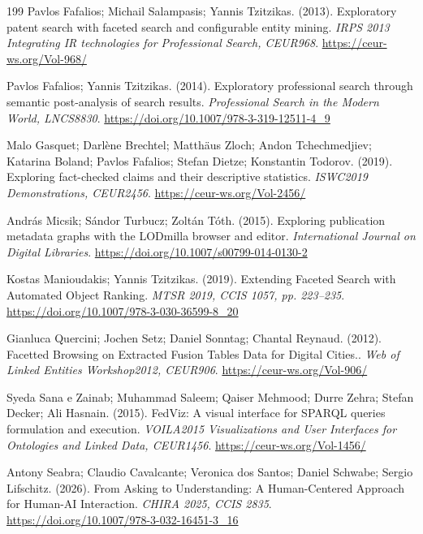 \documentclass[manuscript,review,screen]{acmart}
\begin{document}
\begin{thebibliography}{199}
 Pavlos Fafalios; Michail Salampasis; Yannis Tzitzikas. (2013). Exploratory patent search with faceted search and configurable entity mining. \textit{IRPS 2013 Integrating IR technologies for Professional Search, CEUR968}. \url{https://ceur-ws.org/Vol-968/}

 Pavlos Fafalios; Yannis Tzitzikas. (2014). Exploratory professional search through semantic post-analysis of search results. \textit{Professional Search in the Modern World, LNCS8830}. \url{https://doi.org/10.1007/978-3-319-12511-4_9}

 Malo Gasquet; Darl\`{e}ne Brechtel; Matth\"{a}us Zloch; Andon Tchechmedjiev; Katarina Boland; Pavlos Fafalios; Stefan Dietze; Konstantin Todorov. (2019). Exploring fact-checked claims and their descriptive statistics. \textit{ISWC2019 Demonstrations, CEUR2456}. \url{https://ceur-ws.org/Vol-2456/}

 Andr\'{a}s Micsik; S\'{a}ndor Turbucz; Zolt\'{a}n T\'{o}th. (2015). Exploring publication metadata graphs with the LODmilla browser and editor. \textit{International Journal on Digital Libraries}. \url{https://doi.org/10.1007/s00799-014-0130-2}

 Kostas Manioudakis; Yannis Tzitzikas. (2019). Extending Faceted Search with Automated Object Ranking. \textit{MTSR 2019, CCIS 1057, pp. 223--235}. \url{https://doi.org/10.1007/978-3-030-36599-8_20}

 Gianluca Quercini; Jochen Setz; Daniel Sonntag; Chantal Reynaud. (2012). Facetted Browsing on Extracted Fusion Tables Data for Digital Cities.. \textit{Web of Linked Entities Workshop2012, CEUR906}. \url{https://ceur-ws.org/Vol-906/}

 Syeda Sana e Zainab; Muhammad Saleem; Qaiser Mehmood; Durre Zehra; Stefan Decker; Ali Hasnain. (2015). FedViz: A visual interface for SPARQL queries formulation and execution. \textit{VOILA2015 Visualizations and User Interfaces for Ontologies and Linked Data, CEUR1456}. \url{https://ceur-ws.org/Vol-1456/}

 Antony Seabra; Claudio Cavalcante; Veronica dos Santos; Daniel Schwabe; Sergio Lifschitz. (2026). From Asking to Understanding: A Human-Centered Approach for Human-AI Interaction. \textit{CHIRA 2025, CCIS 2835}. \url{https://doi.org/10.1007/978-3-032-16451-3_16}


\end{thebibliography}
\end{document}
